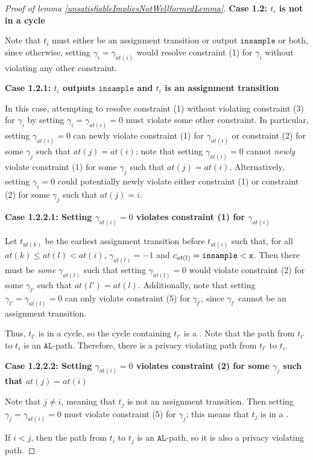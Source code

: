 \begin{proof}[Proof of lemma \ref{unsatisfiableImpliesNotWellformedLemma}]
    \textbf{Case 1.2: $t_i$ is not in a cycle}

    Note that $t_i$ must either be an assignment transition or output $\texttt{insample}$ or both, since otherwise, setting $\gamma_i = \gamma_{at(i)}$ would resolve constraint (1) for $\gamma_i$ without violating any other constraint. 

    \textbf{Case 1.2.1: $t_i$ outputs $\texttt{insample}$ and $t_i$ is an assignment transition}

    In this case, attempting to resolve constraint (1) without violating constraint (3) for $\gamma_i$ by setting $\gamma_i = \gamma_{at(i)} = 0$ must violate some other constraint. In particular, setting $\gamma_{at(i)} = 0$ can newly violate constraint (1) for $\gamma_{at(i)}$ or constraint (2) for some $\gamma_j$ such that $at(j) = at(i)$; note that setting $\gamma_{at(i)}=0$ cannot \textit{newly} violate constraint (1) for some $\gamma_j$ such that $at(j) = at(i)$. 
    Alternatively, setting $\gamma_i = 0$ could potentially newly violate either constraint (1) or constraint (2) for some $\gamma_j$ such that $at(j) = i$. 

    \textbf{Case 1.2.2.1: Setting $\gamma_{at(i)} =0$ violates constraint (1) for $\gamma_{at(i)}$}

    Let $t_{at(k)}$ be the earliest assignment transition before $t_{at(i)}$ such that, for all $at(k)\leq at(l)< at(i)$, $\gamma_{at(l)} = -1$ and $c_{at(l)} = \lguard[\texttt{x}]$. Then there must be \textit{some} $\gamma_{at(l)}$ such that setting $\gamma_{at(l)} = 0$ would violate constraint (2) for some $\gamma_{l'}$ such that $at(l') = at(l)$.  
    Additionally, note that setting $\gamma_{l'} = \gamma_{at(l)} = 0$ can only violate constraint (5) for $\gamma_{l'}$, since $\gamma_{l'}$ cannot be an assignment transition. 
    
    Thus, $t_{l'}$ is in a cycle, so the cycle containing $t_{l'}$ is a \gcycle. Note that the path from $t_{l'}$ to $t_i$ is an $\texttt{AL}$-path. Therefore, there is a privacy violating path from $t_{l'}$ to $t_i$.

    \textbf{Case 1.2.2.2: Setting $\gamma_{at(i)} =0$ violates constraint (2) for some $\gamma_j$ such that $at(j) = at(i)$}

    Note that $j\neq i$, meaning that $t_j$ is not an assignment transition. Then setting $\gamma_j = \gamma_{at(i)} = 0$ must violate constraint (5) for $\gamma_j$; this means that $t_j$ is in a \gcycle. 

    If $i<j$, then the path from $t_i$ to $t_j$ is an $\texttt{AL}$-path, so it is also a privacy violating path.


\end{proof}
